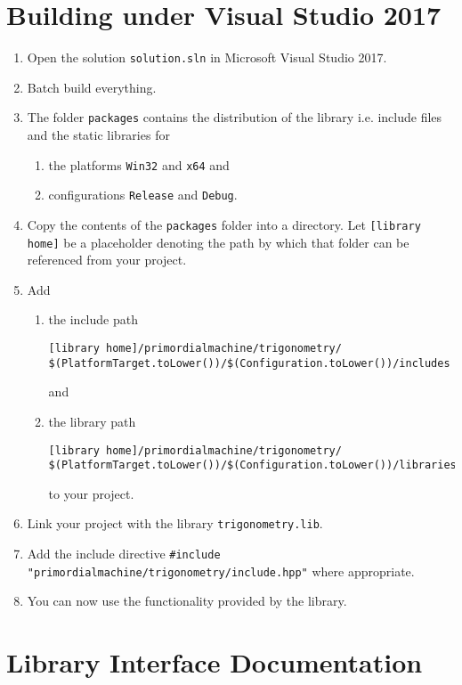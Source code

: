 \documentclass[oneside]{article}
\begin{document}
\section{Building under Visual Studio 2017}
\begin{enumerate}
\item Open the solution \texttt{solution.sln} in Microsoft Visual Studio 2017.
\item Batch build everything.
\item The folder \texttt{packages} contains the distribution of the library i.e. include files and the
      static libraries for
  \begin{enumerate}
    \item the platforms \texttt{Win32} and \texttt{x64} and
    \item configurations \texttt{Release} and \texttt{Debug}.
  \end{enumerate}
\item Copy the contents of the \verb+packages+ folder into a directory. Let
      \verb+[library home]+ be a placeholder denoting the path by which that folder
      can be referenced from your project.
\item Add
  \begin{enumerate}
    \item the include path
\begin{verbatim}
[library home]/primordialmachine/trigonometry/
$(PlatformTarget.toLower())/$(Configuration.toLower())/includes
\end{verbatim}
	and
    \item the library path
\begin{verbatim}
[library home]/primordialmachine/trigonometry/
$(PlatformTarget.toLower())/$(Configuration.toLower())/libraries
\end{verbatim}
    to your project.
\end{enumerate}
\item Link your project with the library \verb+trigonometry.lib+.
\item Add the include directive \verb+#include "primordialmachine/trigonometry/include.hpp"+ where appropriate.
\item You can now use the functionality provided by the library.
\end{enumerate}

\section{Library Interface Documentation}
\end{document}
